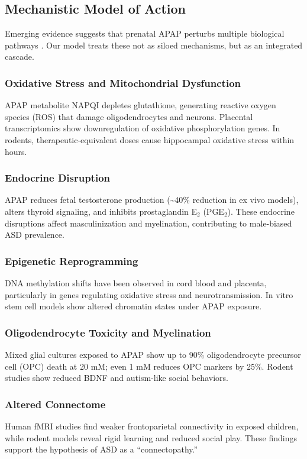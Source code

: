 \documentclass[12pt]{article}
\begin{document}
\subsection{Mechanistic Model of Action}
Emerging evidence suggests that prenatal APAP perturbs multiple biological pathways \citep{baker2020,kristensen2016,zhu2021}. Our model treats these not as siloed mechanisms, but as an integrated cascade.

\subsubsection{Oxidative Stress and Mitochondrial Dysfunction}
APAP metabolite NAPQI depletes glutathione, generating reactive oxygen species (ROS) that damage oligodendrocytes and neurons. Placental transcriptomics show downregulation of oxidative phosphorylation genes. In rodents, therapeutic-equivalent doses cause hippocampal oxidative stress within hours.

\subsubsection{Endocrine Disruption}
APAP reduces fetal testosterone production (\textasciitilde40\% reduction in ex vivo models), alters thyroid signaling, and inhibits prostaglandin E$_2$ (PGE$_2$). These endocrine disruptions affect masculinization and myelination, contributing to male-biased ASD prevalence.

\subsubsection{Epigenetic Reprogramming}
DNA methylation shifts have been observed in cord blood and placenta, particularly in genes regulating oxidative stress and neurotransmission. In vitro stem cell models show altered chromatin states under APAP exposure.

\subsubsection{Oligodendrocyte Toxicity and Myelination}
Mixed glial cultures exposed to APAP show up to 90\% oligodendrocyte precursor cell (OPC) death at 20 mM; even 1 mM reduces OPC markers by 25\%. Rodent studies show reduced BDNF and autism-like social behaviors.

\subsubsection{Altered Connectome}
Human fMRI studies find weaker frontoparietal connectivity in exposed children, while rodent models reveal rigid learning and reduced social play. These findings support the hypothesis of ASD as a ``connectopathy.''
\end{document}
